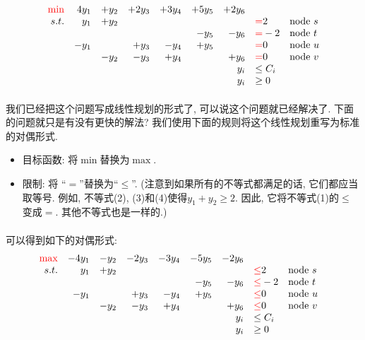 \documentclass[a4paper]{article}
\begin{document}
\[
\begin{array}{rrrrrrrllllll}
\textcolor{red}{\bf \min } &4y_1&+ y_2&+ 2y_3&+3y_4&+5y_5&+2y_6 &         &  \\
 s.t. & y_1 &+ y_2&    &    &      &      & \textcolor{red}{=}  2 &  \text{node } s \\
      &     &     &    &    &  -y_5 &-y_6 & \textcolor{red}{=}  -2 &  \text{node } t\\
      & -y_1 &     &+y_3&-y_4&+y_5 &      & \textcolor{red}{=}  0 &  \text{node } u\\
      &     & -y_2&-y_3&+y_4&   &+y_6 & \textcolor{red}{=}  0 &  \text{node } v\\
      &     &     &    &    &      &  y_i & \leq  C_i & \\
      &     &     &    &    &      &  y_i & \geq  0 & \\
\end{array} \nonumber
\]
        \paragraph{}我们已经把这个问题写成线性规划的形式了, 可以说这个问题就已经解决了. 下面的问题就只是有没有更快的解法? 我们使用下面的规则将这个线性规划重写为标准的对偶形式.
\begin{itemize}
 \item 目标函数: 将$\min$替换为$\max$.
 \item 限制: 将 ``$=$''替换为``$\leq$''. (注意到如果所有的不等式都满足的话, 它们都应当取等号. 例如, 不等式(2), (3)和(4)使得$y_{1} + y_{2} \geq 2$. 因此, 它将不等式(1)的$\leq$变成$=$. 其他不等式也是一样的.)
\end{itemize} 
        \paragraph{}可以得到如下的对偶形式:
\[
\begin{array}{rrrrrrrllllll}
\textcolor{red}{ \max } &-4y_1&-y_2&-2y_3&-3y_4&-5y_5&-2y_6 &         &   \\
 s.t. & y_1 &+y_2&    &    &      &      & \textcolor{red}{\leq}  2 &  \text{node } s  \\
      &     &     &    &    &-y_5 &-y_6 & \textcolor{red}{\leq}  -2 &  \text{node } t  \\
      &-y_1 &     &+y_3&-y_4&+y_5 &      & \textcolor{red}{\leq}  0 &  \text{node } u  \\
      &     &-y_2&-y_3&+y_4&   &+y_6 & \textcolor{red}{\leq} 0 &  \text{node } v  \\
      &     &     &    &    &      &  y_i & \leq  C_i &  &\\
      &     &     &    &    &      &  y_i & \geq  0 &  &\\
\end{array}
\]
\end{document}
